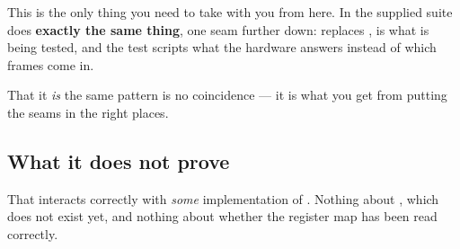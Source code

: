 This is the only thing you need to take with you from here. In  the supplied
suite does \textbf{exactly the same thing}, one seam further down:  replaces
,  is what is being tested, and the test scripts what the hardware answers
instead of which frames come in.

That it \emph{is} the same pattern is no coincidence --- it is what you get from putting the seams
in the right places.

\subsection{What it does not prove}

That  interacts correctly with \emph{some} implementation of .
Nothing about , which does not exist yet, and nothing about whether the register map has
been read correctly.
